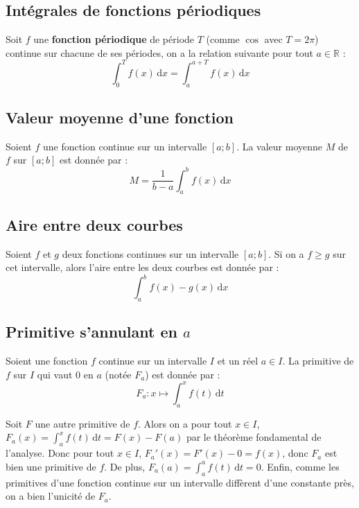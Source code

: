 	\subsection{Intégrales de fonctions périodiques}
	
	\begin{formula}
		Soit $f$ une \textbf{fonction périodique} de période $T$ (comme $\cos$ avec $T = 2\pi$) continue sur chacune de ses périodes, on a la relation suivante pour tout $a \in \mathbb{R}$ :
		\[ \int_{0}^{T} f(x) \, \mathrm{d}x = \int_{a}^{a + T} f(x) \, \mathrm{d}x \]
	\end{formula}
	
	\subsection{Valeur moyenne d'une fonction}
	
	\begin{formula}
		Soient $f$ une fonction continue sur un intervalle $[a;b]$. La valeur moyenne $M$ de $f$ sur $[a;b]$ est donnée par :
		\[ M = \frac{1}{b-a}\int_{a}^{b} f(x) \, \mathrm{d}x \]
	\end{formula}
	
	\subsection{Aire entre deux courbes}
	
	\begin{formula}
		Soient $f$ et $g$ deux fonctions continues sur un intervalle $[a;b]$. Si on a $f \geq g$ sur cet intervalle, alors l'aire entre les deux courbes est donnée par :
		\[ \int_{a}^{b} f(x) - g(x) \, \mathrm{d}x \]
	\end{formula}
	
	\subsection{Primitive s'annulant en \texorpdfstring{$a$}{a}}
	
	\begin{formula}
		Soient une fonction $f$ continue sur un intervalle $I$ et un réel $a \in I$. La primitive de $f$ sur $I$ qui vaut $0$ en $a$ (notée $F_a$) est donnée par :
		\[ F_a : x \mapsto \int_{a}^{x} f(t) \, \mathrm{d}t \]
	\end{formula}
	
	\begin{demonstration}
		Soit $F$ une autre primitive de $f$. Alors on a pour tout $x \in I$, $F_a(x) = \int_a^x f(t) \, \mathrm{d}t = F(x) - F(a)$ par le théorème fondamental de l'analyse.
		\newpar
		Donc pour tout $x \in I$, $F_a'(x) = F'(x) - 0 = f(x)$, donc $F_a$ est bien une primitive de $f$.
		\newpar
		De plus, $F_a(a) = \int_{a}^{a} f(t) \, \mathrm{d}t = 0$.
		\newpar
		Enfin, comme les primitives d'une fonction continue sur un intervalle diffèrent d'une constante près, on a bien l'unicité de $F_a$.
	\end{demonstration}
